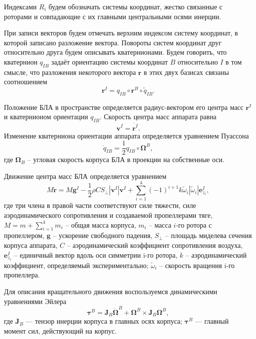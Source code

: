 Индексами $R_i$ будем обозначать системы координат, жестко связанные с роторами и совпадающие с их главными центральными осями инерции.

При записи векторов будем отмечать верхним индексом систему координат, в которой записано разложение вектора. Повороты систем координат друг относительно друга будем описывать кватернионами. Будем говорить, что кватернион $q_{IB}$ задаёт ориентацию системы координат $B$ относительно $I$ в том смысле, что разложения некоторого вектора $\bm{r}$ в этих двух базисах связаны соотношением
\begin{equation} \label{eq:m_quat}
\bm{r}^I = q_{IB} \circ \bm{r}^B \circ \tilde{q}_{IB}.
\end{equation}

Положение БЛА в пространстве определяется радиус-вектором его центра масс $\bm{r}^I$ и кватернионом ориентации $q_{IB}$. Скорость центра масс аппарата равна
\begin{equation} \label{eq:m_vel}
\bm{v}^I = \dot{\bm{r}^I}.
\end{equation}
Изменение кватерниона ориентации аппарата определяется уравнением Пуассона
\begin{equation} \label{eq:m_puasson}
\dot{q}_{IB} = \frac{1}{2} {q}_{IB} \circ \bm{\Omega}^B,
\end{equation}
где $\bm{\Omega}_B$ – угловая скорость корпуса БЛА в проекции на собственные оси.

Движение центра масс БЛА определяется уравнением
\begin{equation} \label{eq:m_traslational_motion}
M \ddot{\bm{r}} = M \bm{g}^I - \frac{1}{2} \rho C S_{\perp} |\bm{v}^I| \bm{v}^I + \sum_{i=1}^{4}{ { (-1)^{i+1} k \tilde \omega_i |\tilde \omega_i| \bm{e}^I_{z_i}}},
\end{equation}
где три члена в правой части соответствуют силе тяжести, силе аэродинамического сопротивления и создаваемой пропеллерами тяге, $M = m + \sum_{i=1}^{4}{m_i}$ – общая масса корпуса, $m_i$ – масса $i$-го ротора с пропеллером, $\bm g$ – ускорение свободного падения, $S_{\perp}$ – площадь миделева сечения корпуса аппарата, $C$ – аэродинамический коэффициент сопротивления воздуха, $\bm{e}^I_{z_i}$ – единичный вектор вдоль оси симметрии i-го ротора, $k$ – аэродинамический коэффициент, определяемый экспериментально; $\tilde \omega_i$ – скорость вращения i-го пропеллера.

Для описания вращательного движения воспользуемся динамическими уравнениями Эйлера
\begin{equation} \label{eq:m_rotational_motion}
\bm{\tau}^{B} =
\bm{J}_B\dot{\bm{\Omega}}^B + \bm{\Omega}^B \times \bm{J}_B{\bm{\Omega}^B},
\end{equation}
где $\bm{J}_B$ — тензор инерции корпуса в главных осях корпуса; $\bm{\tau}^{B}$ —
главный момент сил, действующий на корпус.

